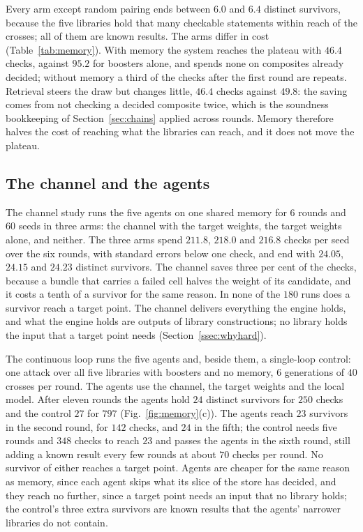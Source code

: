 Every arm except random pairing ends between $6.0$ and $6.4$ distinct survivors, because the five libraries hold that many checkable statements within reach of the crosses; all of them are known results. The arms differ in cost (Table~\ref{tab:memory}). With memory the system reaches the plateau with $46.4$ checks, against $95.2$ for boosters alone, and spends none on composites already decided; without memory a third of the checks after the first round are repeats. Retrieval steers the draw but changes little, $46.4$ checks against $49.8$: the saving comes from not checking a decided composite twice, which is the soundness bookkeeping of Section~\ref{sec:chains} applied across rounds. Memory therefore halves the cost of reaching what the libraries can reach, and it does not move the plateau.

\subsection{The channel and the agents}\label{ssec:agentsexp}

The channel study runs the five agents on one shared memory for $6$ rounds and $60$ seeds in three arms: the channel with the target weights, the target weights alone, and neither. The three arms spend $211.8$, $218.0$ and $216.8$ checks per seed over the six rounds, with standard errors below one check, and end with $24.05$, $24.15$ and $24.23$ distinct survivors. The channel saves three per cent of the checks, because a bundle that carries a failed cell halves the weight of its candidate, and it costs a tenth of a survivor for the same reason. In none of the $180$ runs does a survivor reach a target point. The channel delivers everything the engine holds, and what the engine holds are outputs of library constructions; no library holds the input that a target point needs (Section~\ref{ssec:whyhard}).

The continuous loop runs the five agents and, beside them, a single-loop control: one attack over all five libraries with boosters and no memory, $6$ generations of $40$ crosses per round. The agents use the channel, the target weights and the local model. After eleven rounds the agents hold $24$ distinct survivors for $250$ checks and the control $27$ for $797$ (Fig.~\ref{fig:memory}(c)). The agents reach $23$ survivors in the second round, for $142$ checks, and $24$ in the fifth; the control needs five rounds and $348$ checks to reach $23$ and passes the agents in the sixth round, still adding a known result every few rounds at about $70$ checks per round. No survivor of either reaches a target point. Agents are cheaper for the same reason as memory, since each agent skips what its slice of the store has decided, and they reach no further, since a target point needs an input that no library holds; the control's three extra survivors are known results that the agents' narrower libraries do not contain.

